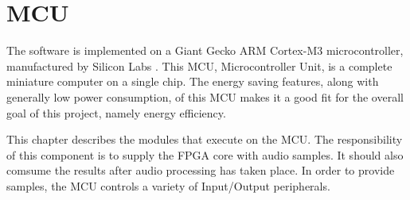 \clearpage
\section{MCU} \label{section:mcu}

The software is implemented on a Giant Gecko ARM Cortex-M3 microcontroller, 
manufactured by Silicon Labs . 
This MCU, Microcontroller Unit, is a complete miniature computer on a single chip. 
The energy saving features, along with generally low power consumption, of this MCU 
makes it a good fit for the overall goal of this project, namely energy efficiency. 

This chapter describes the modules that execute on the MCU. The responsibility 
of this component is to supply the FPGA core  with audio 
samples. It should also comsume the results after audio processing has taken 
place. In order to provide samples, the MCU controls a variety of Input/Output 
peripherals. 







